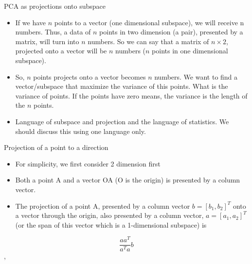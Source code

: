 \documentclass[
  ignorenonframetext,
]{beamer}
\begin{document}
\begin{frame}{PCA as projections onto subspace}
\protect\hypertarget{pca-as-projections-onto-subspace}{}
\begin{itemize}
\item
  If we have \(n\) points to a vector (one dimensional subspace), we
  will receive n numbers. Thus, a data of \(n\) points in two dimension
  (a pair), presented by a matrix, will turn into \(n\) numbers. So we
  can say that a matrix of \(n \times 2\), projected onto a vector will
  be \(n\) numbers (\(n\) points in one dimensional subspace).
\item
  So, \(n\) points projects onto a vector becomes \(n\) numbers. We want
  to find a vector/subspace that maximize the variance of this points.
  What is the variance of points. If the points have zero means, the
  variance is the length of the \(n\) points.
\item
  Language of subspace and projection and the language of statistics. We
  should discuss this using one language only.
\end{itemize}
\end{frame}

\begin{frame}{Projection of a point to a direction}
\protect\hypertarget{projection-of-a-point-to-a-direction}{}
\begin{itemize}
\item
  For simplicity, we first consider 2 dimension first
\item
  Both a point A and a vector OA (O is the origin) is presented by a
  column vector.
\item
  The projection of a point A, presented by a column vector
  \(b = [b_1, b_2]^T\) onto a vector through the origin, also presented
  by a column vector, \(a = [a_1, a_2]^T\) (or the span of this vector
  which is a 1-dimensional subspace) is
\end{itemize}

\[
\frac{aa^T}{a^Ta}b
\],
\end{frame}
\end{document}
